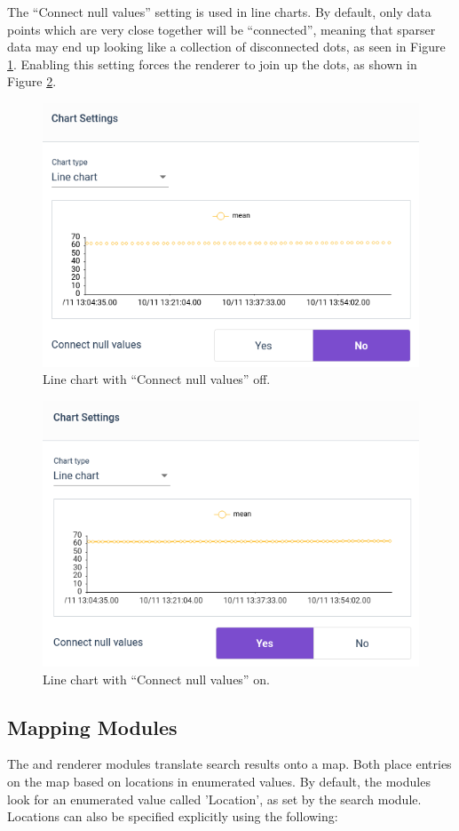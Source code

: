The ``Connect null values'' setting is used in line charts. By default, only data points which are very close together will be ``connected'', meaning that sparser data may end up looking like a collection of disconnected dots, as seen in Figure \ref{fig:unconnected-null}. Enabling this setting forces the renderer to join up the dots, as shown in Figure \ref{fig:connected-null}.

\begin{figure}
	\includegraphics[width=0.6\linewidth]{images/unconnected-null.png}
	\caption{Line chart with ``Connect null values'' off.}
	\label{fig:unconnected-null}
\end{figure}

\begin{figure}
	\includegraphics[width=0.6\linewidth]{images/connected-null.png}
	\caption{Line chart with ``Connect null values'' on.}
	\label{fig:connected-null}
\end{figure}

\clearpage

\subsection{Mapping Modules}
The  and  renderer modules translate search results onto
a map. Both place entries on the map based on locations in enumerated
values. By default, the modules look for an enumerated value called
'Location', as set by the  search module. Locations can also be
specified explicitly using the following:

